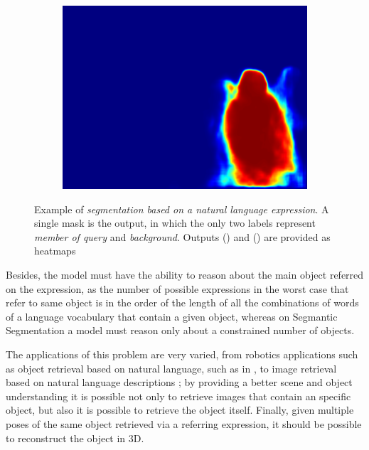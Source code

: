 \begin{figure}
\begin{subfigure}[b]{0.27\columnwidth}
            \centering
            \includegraphics[width=\textwidth]{./figures/Mask_2.png}
    \label{subfig:man_blue}
    \end{subfigure}
    \caption{\label{fig:query} Example of \textit{segmentation based on a natural language expression}. A single mask is the output, in which the only two labels represent \textit{member of query} and \textit{background}. Outputs () and () are provided as heatmaps}
    \label{Fig:Intro_Descr}
\end{figure}

Besides, the model must have the ability to reason about the main object referred on the expression, as the number of possible expressions in the worst case that refer to same object is in the order of the length of all the combinations of words of a language vocabulary that contain a given object, whereas on Segmantic Segmentation a model must reason only about a constrained number of objects.

The applications of this problem are very varied, from robotics applications such as object retrieval based on natural language, such as in \cite{guadarrama_understanding_2016}, to image retrieval based on natural language descriptions \cite{schuster2015generating}; by providing a better scene and object understanding it is possible not only to retrieve images that contain an specific object, but also it is possible to retrieve the object itself. Finally, given multiple poses of the same object retrieved via a referring expression, it should be possible to reconstruct the object in 3D.

